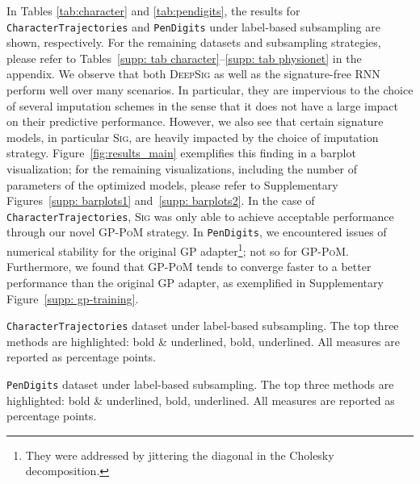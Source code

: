 \documentclass{article}
\begin{document}
In Tables \ref{tab:character} and \ref{tab:pendigits}, the results for
\texttt{CharacterTrajectories} and \texttt{PenDigits} under label-based
subsampling are shown, respectively. For the remaining datasets and
subsampling strategies, please refer to Tables~\ref{supp: tab
character}--\ref{supp: tab physionet} in the appendix. 
%
%
We observe that both \textsc{DeepSig} as well as the signature-free \textsc{RNN} perform well
over many scenarios. In particular, they are impervious to the choice of
several imputation schemes in the sense that it does not have a large
impact on their predictive performance.
%
However, we also see that certain signature models, in particular
\textsc{Sig}, are heavily impacted by the choice of imputation strategy.
Figure~\ref{fig:results_main} exemplifies this finding in a barplot
visualization; for the remaining visualizations, including the number of
parameters of the optimized models, please refer to Supplementary
Figures~\ref{supp: barplots1} and~\ref{supp: barplots2}. In the case of
\texttt{CharacterTrajectories}, \textsc{Sig} was only able to achieve
acceptable performance through our novel \textsc{GP-PoM} strategy. In
\texttt{PenDigits}, we encountered issues of numerical stability for the
original GP adapter\footnote{They were addressed by jittering the
diagonal in the Cholesky decomposition.}; not so for \textsc{GP-PoM}.
Furthermore, we found that \textsc{GP-PoM} tends to converge faster to
a better performance than the original GP adapter, as exemplified in
Supplementary Figure~\ref{supp: gp-training}.

\begin{table}[t]
    \caption{\texttt{CharacterTrajectories} dataset under label-based subsampling. The top three methods are highlighted: bold \& underlined, bold, underlined. All measures are reported as percentage points.}
    \centering
    
    \label{tab:character}
\end{table}

\begin{table}[ht]
    \caption{\texttt{PenDigits} dataset under label-based subsampling. The top three methods are highlighted: bold \& underlined, bold, underlined. All measures are reported as percentage points.}
    \centering
    
    \label{tab:pendigits}
\end{table}
\end{document}
